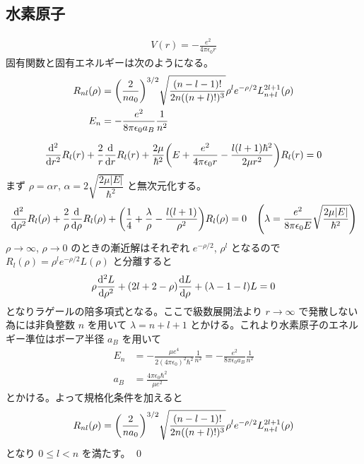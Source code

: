 \documentclass[uplatex,dvipdfmx,a4paper,11pt]{jlreq}
\makeatletter
\numberwithin{equation}{section}
\theoremstyle{definition}
\renewenvironment{proof}[1][\proofname]{\par
  \normalfont
  \topsep6\p@\@plus6\p@ \trivlist
  \item[\hskip\labelsep{\bfseries #1}\@addpunct{\bfseries}]\ignorespaces\quad\par
}{%
  \qed\endtrivlist\@endpefalse
}
\renewcommand\proofname{証明}
\makeatother
\begin{document}
\subsection{水素原子}
\begin{proposition}
  \begin{align}
    V(r) = -\frac{e^2}{4\pi\epsilon_0r}
  \end{align}
  固有関数と固有エネルギーは次のようになる。
  \begin{align}
    R_{nl}(\rho) & = \qty(\frac{2}{na_0})^{3/2}\sqrt{\frac{(n-l-1)!}{2n((n+l)!)^3}}\rho^le^{-\rho/2}L_{n+l}^{2l+1}(\rho) \\
    E_n          & = - \frac{e^2}{8\pi\epsilon_0a_B}\frac{1}{n^2}
  \end{align}
\end{proposition}
\begin{proof}
  \begin{align}
    \dv[2]{r}R_l(r) + \frac{2}{r}\dv{r}R_l(r) + \frac{2\mu}{\hbar^2}\qty(E + \frac{e^2}{4\pi\epsilon_0r} - \frac{l(l+1)\hbar^2}{2\mu r^2})R_l(r) = 0
  \end{align}
  まず $\rho = \alpha r$, $\alpha = 2\sqrt{\dfrac{2\mu|E|}{\hbar^2}}$ と無次元化する。
  \begin{align}
    \dv[2]{\rho}R_l(\rho) + \frac{2}{\rho}\dv{\rho}R_l(\rho) + \qty(\frac{1}{4} + \frac{\lambda}{\rho} - \frac{l(l+1)}{\rho^2})R_l(\rho) & = 0 & \qty(\lambda = \frac{e^2}{8\pi\epsilon_0E}\sqrt{\dfrac{2\mu|E|}{\hbar^2}})
  \end{align}
  $\rho\to\infty$, $\rho\to 0$ のときの漸近解はそれぞれ $e^{-\rho/2}$, $\rho^l$ となるので $R_l(\rho) = \rho^le^{-\rho/2}L(\rho)$ と分離すると
  \begin{align}
    \rho\dv[2]{L}{\rho} + (2l + 2 - \rho)\dv{L}{\rho} + (\lambda - 1 - l)L = 0
  \end{align}
  となりラゲールの陪多項式となる。ここで級数展開法より $r\to\infty$ で発散しない為には非負整数 $n$ を用いて $\lambda = n + l + 1$ とかける。これより水素原子のエネルギー準位はボーア半径 $a_B$ を用いて
  \begin{align}
    E_n & = - \frac{\mu e^4}{2(4\pi\epsilon_0)^2\hbar^2}\frac{1}{n^2} =  - \frac{e^2}{8\pi\epsilon_0a_B}\frac{1}{n^2} \\
    a_B & = \frac{4\pi\epsilon_0\hbar^2}{\mu e^2}
  \end{align}
  とかける。よって規格化条件を加えると
  \begin{align}
    R_{nl}(\rho) = \qty(\frac{2}{na_0})^{3/2}\sqrt{\frac{(n-l-1)!}{2n((n+l)!)^3}}\rho^le^{-\rho/2}L_{n+l}^{2l+1}(\rho)
  \end{align}
  となり $0\leq l < n$ を満たす。
\end{proof}
\end{document}
